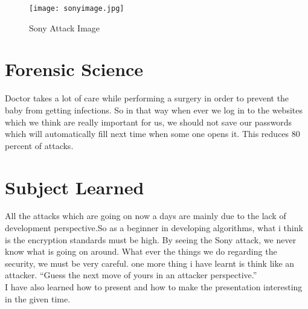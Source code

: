 \documentclass{article}
\begin{document}
\begin{figure}[htb]
\centering
\texttt{[image: sonyimage.jpg]}
\caption{Sony Attack Image}
\label{fig:sonyimage}
\end{figure}

\section{Forensic Science}
Doctor takes a lot of care while performing a surgery in order to prevent the baby from getting infections. So in that way when ever we log in to the websites which we think are really important for us, we should not save our passwords which will automatically fill next time when some one opens it. This reduces 80 percent of attacks.

\section{Subject Learned}
All the attacks which are going on now a days are mainly due to the lack of development perspective.So as a beginner in developing algorithms, what i think is the encryption standards must be high. By seeing the Sony attack, we never know what is going on around. What ever the things we do regarding the security, we must be very careful. one more thing i have learnt is think like an attacker. “Guess the next move of yours in an attacker perspective.”\\ I have also learned how to present and how to make the presentation interesting in the given time.
\end{document}
